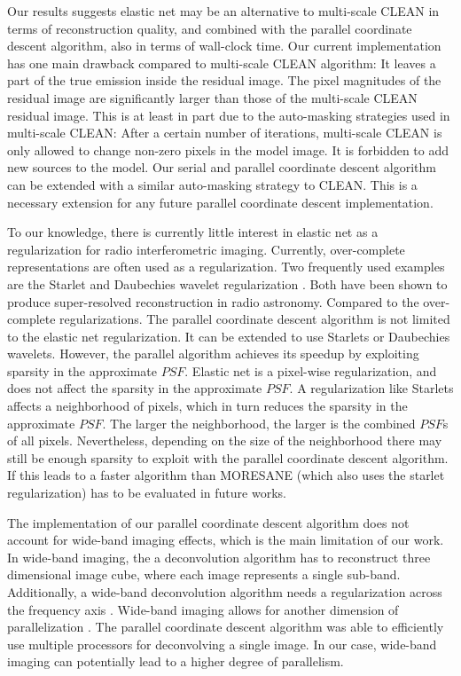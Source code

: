 Our results suggests elastic net may be an alternative to multi-scale CLEAN in terms of reconstruction quality, and combined with the parallel coordinate descent algorithm, also in terms of wall-clock time. Our current implementation has one main drawback compared to multi-scale CLEAN algorithm: It leaves  a part of the true emission inside the residual image. The pixel magnitudes of the residual image are significantly larger than those of the multi-scale CLEAN residual image. This is at least in part due to the auto-masking strategies used in multi-scale CLEAN: After a certain number of iterations, multi-scale CLEAN is only allowed to change non-zero pixels in the model image. It is forbidden to add new sources to the model. Our serial and parallel coordinate descent algorithm can be extended with a similar auto-masking strategy to CLEAN. This is a necessary extension for any future parallel coordinate descent implementation.

To our knowledge, there is currently little interest in elastic net as a regularization for radio interferometric imaging. Currently, over-complete representations are often used as a regularization. Two frequently used examples are the Starlet \cite{starck2015starlet} and Daubechies wavelet regularization \cite{carrillo2014purify}. Both have been shown to produce super-resolved reconstruction in radio astronomy\cite{girard2015sparse, dabbech2018cygnus}. Compared to the over-complete regularizations. The parallel coordinate descent algorithm is not limited to the elastic net regularization. It can be extended to use Starlets or Daubechies wavelets. However, the parallel algorithm achieves its speedup by exploiting sparsity in the approximate $PSF$. Elastic net is a pixel-wise regularization, and does not affect the sparsity in the approximate $PSF$. A regularization like Starlets affects a neighborhood of pixels, which in turn reduces the sparsity in the approximate $PSF$. The larger the neighborhood, the larger is the combined $PSF$s of all pixels. Nevertheless, depending on the size of the neighborhood there may still be enough sparsity to exploit with the parallel coordinate descent algorithm. If this leads to a faster algorithm than MORESANE (which also uses the starlet regularization) has to be evaluated in future works.

The implementation of our parallel coordinate descent algorithm does not account for wide-band imaging effects, which is the main limitation of our work. In wide-band imaging, the a deconvolution algorithm has to reconstruct three dimensional image cube, where each image represents a single sub-band. Additionally, a wide-band deconvolution algorithm needs a regularization across the frequency axis \cite{ferrari2015multi}. Wide-band imaging allows for another dimension of parallelization \cite{ferrari2015multi}. The parallel coordinate descent algorithm was able to efficiently use multiple processors for deconvolving a single image. In our case, wide-band imaging can potentially lead to a higher degree of parallelism.

